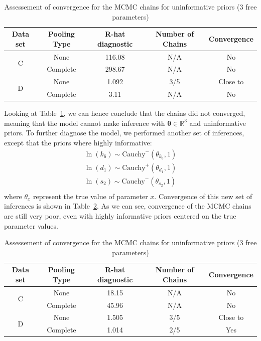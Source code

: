 \documentclass[11pt]{article}
\begin{document}
\begin{table}[!h]
    \centering
    \caption{Assessement of convergence for the MCMC chains for uninformative priors (3 free parameters)}
    \begin{tabular}{c|c||c|c|c}
        \hline
        Data set & Pooling Type & R-hat diagnostic & Number of Chains & Convergence  \\ \hline 
        \multirow{2}{*}{C}      & None  & 116.08 & N/A & No \\
                                & Complete & 298.67 & N/A & No \\ \hline 
        \multirow{2}{*}{D}      & None  & 1.092 & 3/5 & Close to \\
                                & Complete & 3.11 & N/A & No \\ \hline 
    \end{tabular}
    \label{tbl:rhat_2}
\end{table}
Looking at Table~\ref{tbl:rhat_2}, we can hence conclude that the chains did not converged, meaning that the model cannot make inference with $\boldsymbol{\theta} \in \mathbb{R}^3$ and uninformative priors. To further diagnose the model, we performed another set of inferences, except that the priors where highly informative:
\begin{align*}
    \ln(k_6) \sim \text{Cauchy}^-(\theta_{k_6}, 1) \\ 
    \ln(d_1) \sim \text{Cauchy}^+(\theta_{d_1}, 1) \\ 
    \ln(s_2) \sim \text{Cauchy}^-(\theta_{s_2}, 1) \\ 
\end{align*} 
where $\theta_x$ represent the true value of parameter $x$. Convergence of this new set of inferences is shown in Table~\ref{tbl:rhat_3}. As we can see, convergence of the MCMC chains are still very poor, even with highly informative priors centered on the true parameter values.
\begin{table}[!h]
    \centering
    \caption{Assessement of convergence for the MCMC chains for uninformative priors (3 free parameters)}
    \begin{tabular}{c|c||c|c|c}
        \hline
        Data set & Pooling Type & R-hat diagnostic & Number of Chains & Convergence  \\ \hline 
        \multirow{2}{*}{C}      & None  & 18.15 & N/A & No \\
                                & Complete & 45.96 & N/A & No \\ \hline 
        \multirow{2}{*}{D}      & None  & 1.505 & 3/5 & Close to \\
                                & Complete & 1.014 & 2/5 & Yes \\ \hline 
    \end{tabular}
    \label{tbl:rhat_3}
\end{table}
\end{document}

